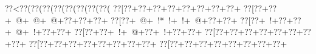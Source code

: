 %
%
%
%
%
%
%
\def\goWhiteInk#1{\special{color push rgb 1 1 1} {#1} \special{color pop}}%
\def\goLap#1#2{\setbox0=\hbox{#1} \rlap{#1} \raise 2\goTextAdj\hbox to \wd0{\hss\eightpoint{#2}\hss}}%
\def\goLapWhite#1#2{\setbox0=\hbox{#1}\rlap{#1}\raise 2\goTextAdj\hbox to \wd0{\hss\eightpoint\goWhiteInk{#2}\hss}}%
\def\rc#1{\raise \goTextAdj\hbox to \goIntWd{\kern \goTextAdj\hss\rm#1\hss}}%
\def\bc#1{\hbox to \goIntWd{\hss#1\hss}}%
\lineskip=0pt
\parindent=0pt
\nopagenumbers
\raggedbottom        %



\vbox{\vbox{\goo
\hbox{\0??<\0??(\0??(\0??(\0??(\0??(\0??(\0??(\0??(}
\hbox{\0??[\0??+\0??+\0??+\0??+\0??+\0??+\0??+\0??+}
\hbox{\0??[\0??+\0??+\- @+\- @+\- @+\0??+\0??+\0??+}
\hbox{\0??[\0??+\- @+\- !*\- !+\- !+\- @+\0??+\0??+}
\hbox{\0??[\0??+\- !+\0??+\0??+\- @+\- !+\0??+\0??+}
\hbox{\0??[\0??+\0??+\- !+\- @+\0??+\- !+\0??+\0??+}
\hbox{\0??[\0??+\0??+\0??+\0??+\0??+\0??+\0??+\0??+}
\hbox{\0??[\0??+\0??+\0??+\0??+\0??+\0??+\0??+\0??+}
\hbox{\0??[\0??+\0??+\0??+\0??+\0??+\0??+\0??+\0??+}
\smallskip
}
}
\hfil\break



